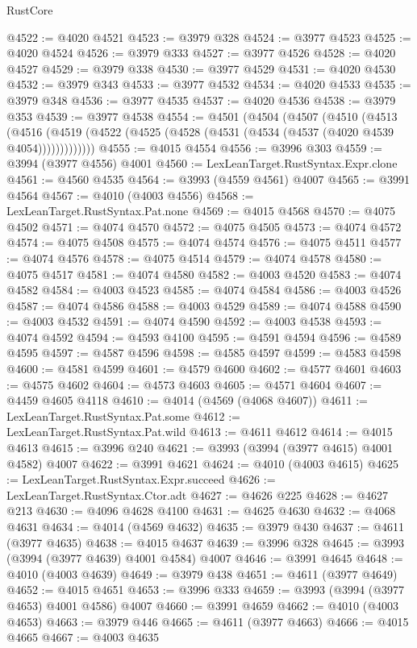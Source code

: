\begin{lexlean}{RustCore}
\begin{coremodule}
@4522 := @4020 @4521
@4523 := @3979 @328
@4524 := @3977 @4523
@4525 := @4020 @4524
@4526 := @3979 @333
@4527 := @3977 @4526
@4528 := @4020 @4527
@4529 := @3979 @338
@4530 := @3977 @4529
@4531 := @4020 @4530
@4532 := @3979 @343
@4533 := @3977 @4532
@4534 := @4020 @4533
@4535 := @3979 @348
@4536 := @3977 @4535
@4537 := @4020 @4536
@4538 := @3979 @353
@4539 := @3977 @4538
@4554 := @4501
    (@4504
      (@4507
        (@4510
          (@4513
            (@4516 (@4519 (@4522 (@4525 (@4528 (@4531 (@4534 (@4537 (@4020 @4539 @4054)))))))))))))
@4555 := @4015 @4554
@4556 := @3996 @303
@4559 := @3994 (@3977 @4556) @4001
@4560 := LexLeanTarget.RustSyntax.Expr.clone
@4561 := @4560 @4535
@4564 := @3993 (@4559 @4561) @4007
@4565 := @3991 @4564
@4567 := @4010 (@4003 @4556)
@4568 := LexLeanTarget.RustSyntax.Pat.none
@4569 := @4015 @4568
@4570 := @4075 @4502
@4571 := @4074 @4570
@4572 := @4075 @4505
@4573 := @4074 @4572
@4574 := @4075 @4508
@4575 := @4074 @4574
@4576 := @4075 @4511
@4577 := @4074 @4576
@4578 := @4075 @4514
@4579 := @4074 @4578
@4580 := @4075 @4517
@4581 := @4074 @4580
@4582 := @4003 @4520
@4583 := @4074 @4582
@4584 := @4003 @4523
@4585 := @4074 @4584
@4586 := @4003 @4526
@4587 := @4074 @4586
@4588 := @4003 @4529
@4589 := @4074 @4588
@4590 := @4003 @4532
@4591 := @4074 @4590
@4592 := @4003 @4538
@4593 := @4074 @4592
@4594 := @4593 @4100
@4595 := @4591 @4594
@4596 := @4589 @4595
@4597 := @4587 @4596
@4598 := @4585 @4597
@4599 := @4583 @4598
@4600 := @4581 @4599
@4601 := @4579 @4600
@4602 := @4577 @4601
@4603 := @4575 @4602
@4604 := @4573 @4603
@4605 := @4571 @4604
@4607 := @4459 @4605 @4118
@4610 := @4014 (@4569 (@4068 @4607))
@4611 := LexLeanTarget.RustSyntax.Pat.some
@4612 := LexLeanTarget.RustSyntax.Pat.wild
@4613 := @4611 @4612
@4614 := @4015 @4613
@4615 := @3996 @240
@4621 := @3993 (@3994 (@3977 @4615) @4001 @4582) @4007
@4622 := @3991 @4621
@4624 := @4010 (@4003 @4615)
@4625 := LexLeanTarget.RustSyntax.Expr.succeed
@4626 := LexLeanTarget.RustSyntax.Ctor.adt
@4627 := @4626 @225
@4628 := @4627 @213
@4630 := @4096 @4628 @4100
@4631 := @4625 @4630
@4632 := @4068 @4631
@4634 := @4014 (@4569 @4632)
@4635 := @3979 @430
@4637 := @4611 (@3977 @4635)
@4638 := @4015 @4637
@4639 := @3996 @328
@4645 := @3993 (@3994 (@3977 @4639) @4001 @4584) @4007
@4646 := @3991 @4645
@4648 := @4010 (@4003 @4639)
@4649 := @3979 @438
@4651 := @4611 (@3977 @4649)
@4652 := @4015 @4651
@4653 := @3996 @333
@4659 := @3993 (@3994 (@3977 @4653) @4001 @4586) @4007
@4660 := @3991 @4659
@4662 := @4010 (@4003 @4653)
@4663 := @3979 @446
@4665 := @4611 (@3977 @4663)
@4666 := @4015 @4665
@4667 := @4003 @4635

\end{coremodule}
\end{lexlean}
